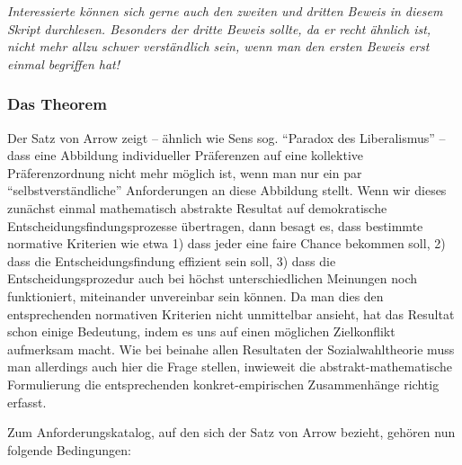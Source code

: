 {\em Interessierte können sich
gerne auch den zweiten und dritten Beweis in diesem Skript durchlesen.
Besonders der dritte Beweis sollte, da er recht ähnlich ist, nicht mehr allzu
schwer verständlich sein, wenn man den ersten Beweis erst einmal begriffen hat!}

\subsubsection{Das Theorem}

Der Satz von Arrow zeigt -- ähnlich wie Sens sog. "`Paradox des Liberalismus"' --
dass eine Abbildung individueller Präferenzen auf eine kollektive
Präferenzordnung nicht mehr möglich ist, wenn man nur ein par
"`selbstverständliche"' Anforderungen an diese Abbildung stellt. Wenn wir dieses
zunächst einmal mathematisch abstrakte Resultat auf demokratische
Entscheidungsfindungsprozesse übertragen, dann besagt es, dass bestimmte
normative Kriterien wie etwa 1) dass jeder eine faire Chance bekommen soll, 2)
dass die Entscheidungsfindung effizient sein soll, 3) dass die
Entscheidungsprozedur auch bei höchst unterschiedlichen Meinungen noch
funktioniert, miteinander unvereinbar sein können. Da man dies den entsprechenden
normativen Kriterien nicht unmittelbar ansieht, hat das Resultat schon einige
Bedeutung, indem es uns auf einen möglichen Zielkonflikt aufmerksam macht. Wie
bei beinahe allen Resultaten der Sozialwahltheorie muss man allerdings auch hier
die Frage stellen, inwieweit die abstrakt-mathematische Formulierung die
entsprechenden konkret-empirischen Zusammenhänge richtig erfasst.

Zum Anforderungskatalog, auf den sich der Satz von Arrow bezieht, 
gehören nun folgende Bedingungen:

